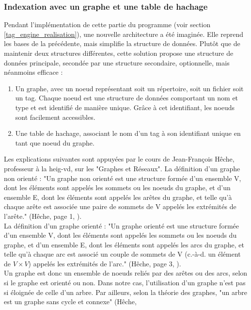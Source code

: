 \documentclass[a4paper, 12pt]{article}
\begin{document}
\subsubsection{Indexation avec un graphe et une table de hachage}\label{graphe_architecture}
Pendant l'implémentation de cette partie du programme (voir section \ref{tag_engine_realisation}), 
une nouvelle architecture a été imaginée. Elle reprend les bases de la précédente, mais simplifie 
la structure de données. Plutôt que de maintenir deux structures différentes, cette solution 
propose une structure de données principale, secondée par une structure secondaire, optionnelle, 
mais néanmoins efficace :
\begin{enumerate}
    \item Un graphe, avec un noeud représentant soit un répertoire, soit un fichier 
        soit un tag. Chaque noeud est une structure de données comportant un nom et type et est 
        identifié de manière unique. Grâce à cet identifiant, les noeuds sont facilement accessibles.
    \item Une table de hachage, associant le nom d'un tag à son identifiant unique en tant que 
        noeud du graphe.
\end{enumerate}
Les explications suivantes sont appuyées par le cours de Jean-François Hêche, professeur à la 
heig-vd, sur les "Graphes et Réseaux". La définition d'un graphe non orienté : "Un graphe non 
orienté est une structure formée d'un ensemble V, dont les éléments sont appelés les sommets 
ou les noeuds du graphe, et d'un ensemble E, dont les éléments sont appelés les arêtes du graphe, 
et telle qu'à chaque arête est associée une paire de sommets de V appelés les extrémités de 
l'arête." (Hêche, page 1, \cite{ref28}).
\\
La définition d'un graphe orienté : "Un graphe orienté est une structure formée d'un ensemble V, dont 
les éléments sont appelés les sommets ou les noeuds du graphe, et d'un ensemble E, dont les éléments 
sont appelés les arcs du graphe, et telle qu'à chaque arc est associé un couple de sommets de 
V (c.-à-d. un élément de $V \times V$) appelés les extrémités de l'arc." (Hêche, page 3, \cite{ref28}). 
\\
Un graphe est donc un ensemble de noeuds reliés par des arêtes ou des arcs, selon si le graphe est 
orienté ou non. Dans notre cas, l'utilisation d'un graphe n'est pas si éloignée de celle d'un arbre. 
Par ailleurs, selon la théorie des graphes, "un arbre est un graphe sans cycle et connexe" (Hêche, 
\end{document}
